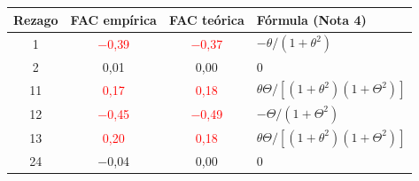 \begin{tabular}{cccl}
\toprule
Rezago & FAC emp\'irica & FAC te\'orica & F\'ormula (Nota 4)
\\ \midrule
1 & \textcolor{red}{\ensuremath{-}0{,}39} & \textcolor{red}{\ensuremath{-}0{,}37} & $-\theta/(1+\theta^2)$ \\
2 & 0{,}01 & 0{,}00 & 0 \\
11 & \textcolor{red}{0{,}17} & \textcolor{red}{0{,}18} & $\theta\Theta/[(1+\theta^2)(1+\Theta^2)]$ \\
12 & \textcolor{red}{\ensuremath{-}0{,}45} & \textcolor{red}{\ensuremath{-}0{,}49} & $-\Theta/(1+\Theta^2)$ \\
13 & \textcolor{red}{0{,}20} & \textcolor{red}{0{,}18} & $\theta\Theta/[(1+\theta^2)(1+\Theta^2)]$ \\
24 & \ensuremath{-}0{,}04 & 0{,}00 & 0 \\
\bottomrule
\end{tabular}
